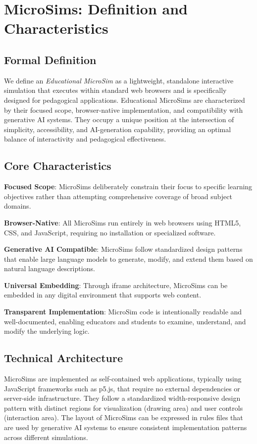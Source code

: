 \section{MicroSims: Definition and Characteristics}
\label{sec:definition}

\subsection{Formal Definition}

We define an \textit{Educational MicroSim} as a lightweight, standalone interactive simulation that executes within standard web browsers and is specifically designed for pedagogical applications. Educational MicroSims are characterized by their focused scope, browser-native implementation, and compatibility with generative AI systems. They occupy a unique position at the intersection of simplicity, accessibility, and AI-generation capability, providing an optimal balance of interactivity and pedagogical effectiveness.

\subsection{Core Characteristics}

\textbf{Focused Scope}: MicroSims deliberately constrain their focus to specific learning objectives rather than attempting comprehensive coverage of broad subject domains.

\textbf{Browser-Native}: All MicroSims run entirely in web browsers using HTML5, CSS, and JavaScript, requiring no installation or specialized software.

\textbf{Generative AI Compatible}: MicroSims follow standardized design patterns that enable large language models to generate, modify, and extend them based on natural language descriptions.

\textbf{Universal Embedding}: Through iframe architecture, MicroSims can be embedded in any digital environment that supports web content.

\textbf{Transparent Implementation}: MicroSim code is intentionally readable and well-documented, enabling educators and students to examine, understand, and modify the underlying logic.

\subsection{Technical Architecture}

MicroSims are implemented as self-contained web applications, typically using JavaScript frameworks such as p5.js, that require no external dependencies or server-side infrastructure. They follow a standardized width-responsive design pattern with distinct regions for visualization (drawing area) and user controls (interaction area). The layout of MicroSims can be expressed in rules files that are used by generative AI systems to ensure consistent implementation patterns across different simulations.

